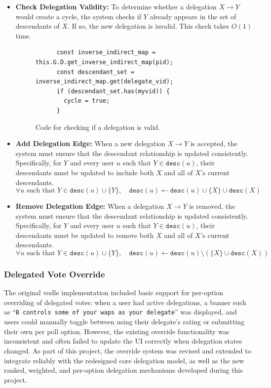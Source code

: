 \begin{itemize}
  \item \textbf{Check Delegation Validity:} To determine whether a delegation \(X \!\to\! Y\) would create a cycle, the system checks if \(Y\) already appears in the set of descendants of \(X\). If so, the new delegation is invalid. This check takes \(O(1)\) time.
  \begin{figure}[H]
    \centering
    \begin{verbatim}
      const inverse_indirect_map = this.G.D.get_inverse_indirect_map(pid);
      const descendant_set = inverse_indirect_map.get(delegate_vid);
      if (descendant_set.has(myvid)) {
        cycle = true;
      }
    \end{verbatim}
    \caption{Code for checking if a delegation is valid.}
  \end{figure}

  \item \textbf{Add Delegation Edge:} When a new delegation \(X \to Y\) is accepted, the system must ensure that the descendant relationship is updated consistently. Specifically, for $Y$ and every user \(u\) such that \(Y \in \texttt{desc}(u)\), their descendants must be updated to include both \(X\) and all of \(X\)'s current descendants.
\[
  \forall u \text{ such that } Y \in \texttt{desc}(u) \cup \{Y\},\quad \texttt{desc}(u) \leftarrow \texttt{desc}(u) \cup \{X\} \cup \texttt{desc}(X)
\]

  \item \textbf{Remove Delegation Edge:} When a delegation \(X \!\to\! Y\) is removed, the system must ensure that the descendant relationship is updated consistently. Specifically, for $Y$ and every user \(u\) such that \(Y \in \texttt{desc}(u)\), their descendants must be updated to remove both \(X\) and all of \(X\)'s current descendants.
\[
  \forall u \text{ such that } Y \in \texttt{desc}(u) \cup \{Y\},\quad \texttt{desc}(u) \leftarrow \texttt{desc}(u) \setminus \left( \{X\} \cup \texttt{desc}(X) \right)
\]
\end{itemize}

\subsubsection{Delegated Vote Override}

The original vodle implementation included basic support for per-option overriding of delegated votes: when a user had active delegations, a banner such as ``\texttt{B controls some of your waps as your delegate}'' was displayed, and users could manually toggle between using their delegate's rating or submitting their own per poll option. However, the existing override functionality was inconsistent and often failed to update the UI correctly when delegation states changed. As part of this project, the override system was revised and extended to integrate reliably with the redesigned core delegation model, as well as the new ranked, weighted, and per-option delegation mechanisms developed during this project.

